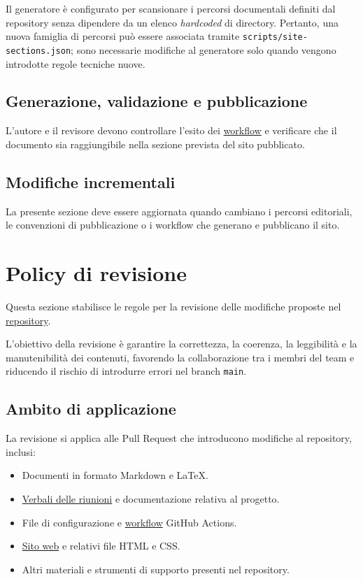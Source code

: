 \documentclass[11pt, a4paper]{article}
\begin{document}
\noindent Il generatore è configurato per scansionare i percorsi documentali definiti dal repository senza dipendere da un elenco \textit{hardcoded} di directory. Pertanto, una nuova famiglia di percorsi può essere associata tramite \texttt{scripts/site-sections.json}; sono necessarie modifiche al generatore solo quando vengono introdotte regole tecniche nuove.

\subsection{Generazione, validazione e pubblicazione}

L'autore e il revisore devono controllare l'esito dei \href{https://github.com/On-By-One-Team/On-By-One.github.io/tree/main/.github/workflows}{workflow} e verificare che il documento sia raggiungibile nella sezione prevista del sito pubblicato.

\subsection{Modifiche incrementali}

La presente sezione deve essere aggiornata quando cambiano i percorsi editoriali, le convenzioni di pubblicazione o i workflow che generano e pubblicano il sito.

\section{Policy di revisione}
\label{sec:policy-di-revisione}

Questa sezione stabilisce le regole per la revisione delle modifiche proposte nel \href{https://github.com/On-By-One-Team/On-By-One.github.io}{repository}.

L'obiettivo della revisione è garantire la correttezza, la coerenza, la leggibilità e la manutenibilità dei contenuti, favorendo la collaborazione tra i membri del team e riducendo il rischio di introdurre errori nel branch \texttt{main}.

\subsection{Ambito di applicazione}

La revisione si applica alle Pull Request che introducono modifiche al repository, inclusi:
\begin{itemize}
    \item Documenti in formato Markdown e LaTeX.
    \item \href{https://github.com/On-By-One-Team/On-By-One.github.io/tree/main/docs/pdf/verbali}{Verbali delle riunioni} e documentazione relativa al progetto.
    \item File di configurazione e \href{https://github.com/On-By-One-Team/On-By-One.github.io/tree/main/.github/workflows}{workflow} GitHub Actions.
    \item \href{https://on-by-one-team.github.io/On-By-One.github.io/}{Sito web} e relativi file HTML e CSS.
    \item Altri materiali e strumenti di supporto presenti nel repository.
\end{itemize}
\end{document}
